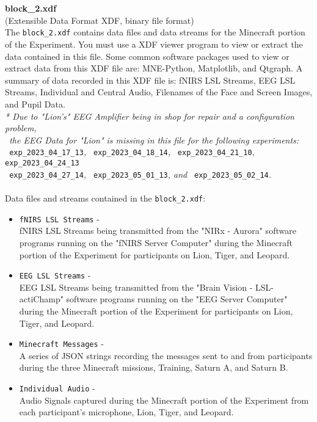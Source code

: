 \begin{description}
\begin{addmargin}[0em]{0em}
    \textbf{\\\\}
    \label{block_2.xdf}
    \textbf{block\_2.xdf}\\(Extensible Data Format XDF, binary file format)\\
    The \verb|block_2.xdf| contains data files and data streams for the Minecraft portion of the Experiment.
    You must use a XDF viewer program to view or extract the data contained in this file.
    Some common software packages used to view or extract data from this XDF file are: MNE-Python, Matplotlib, and Qtgraph.
    A summary of data recorded in this XDF file is: fNIRS LSL Streams, EEG LSL Streams, Individual and Central Audio,
    Filenames of the Face and Screen Images, and Pupil Data.\\
    \textit{* Due to "Lion's" EEG Amplifier being in shop for repair and a configuration problem,}\\
    \verb| |\textit{the EEG Data for "Lion" is missing in this file for the following experiments: }\\
    \verb| exp_2023_04_17_13|\textit{, }\verb| exp_2023_04_18_14|\textit{, }\verb| exp_2023_04_21_10|\textit{, }\verb| exp_2023_04_24_13|\\
    \verb| exp_2023_04_27_14|\textit{, }\verb| exp_2023_05_01_13|\textit{, and }\verb| exp_2023_05_02_14|\textit{.}\\\\
    Data files and streams contained in the \verb|block_2.xdf|:
    \begin{itemize}
        \item \verb|fNIRS LSL Streams| -\\fNIRS LSL Streams being transmitted from the "NIRx - Aurora" software programs running on the "fNIRS Server Computer" during the Minecraft portion of the Experiment for participants on Lion, Tiger, and Leopard.
        \item \verb|EEG LSL Streams| -\\EEG LSL Streams being transmitted from the "Brain Vision - LSL-actiChamp" software programs running on the "EEG Server Computer" during the Minecraft portion of the Experiment for participants on Lion, Tiger, and Leopard.
        \item \verb|Minecraft Messages| -\\A series of JSON strings recording the messages sent to and from participants during the three Minecraft missions, Training, Saturn A, and Saturn B.
        \item \verb|Individual Audio| -\\Audio Signals captured during the Minecraft portion of the Experiment from each participant's microphone, Lion, Tiger, and Leopard.

\end{itemize}
\end{addmargin}
\end{description}
